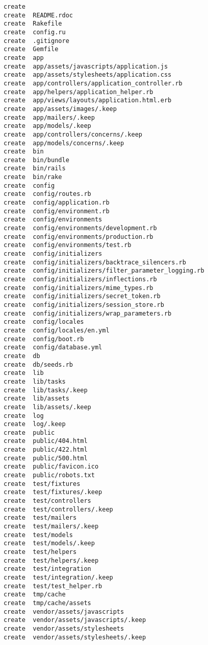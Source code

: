 \documentclass[bidi]{tufte-handout}
\begin{document}
\begin{verbatim}
      create
      create  README.rdoc
      create  Rakefile
      create  config.ru
      create  .gitignore
      create  Gemfile
      create  app
      create  app/assets/javascripts/application.js
      create  app/assets/stylesheets/application.css
      create  app/controllers/application_controller.rb
      create  app/helpers/application_helper.rb
      create  app/views/layouts/application.html.erb
      create  app/assets/images/.keep
      create  app/mailers/.keep
      create  app/models/.keep
      create  app/controllers/concerns/.keep
      create  app/models/concerns/.keep
      create  bin
      create  bin/bundle
      create  bin/rails
      create  bin/rake
      create  config
      create  config/routes.rb
      create  config/application.rb
      create  config/environment.rb
      create  config/environments
      create  config/environments/development.rb
      create  config/environments/production.rb
      create  config/environments/test.rb
      create  config/initializers
      create  config/initializers/backtrace_silencers.rb
      create  config/initializers/filter_parameter_logging.rb
      create  config/initializers/inflections.rb
      create  config/initializers/mime_types.rb
      create  config/initializers/secret_token.rb
      create  config/initializers/session_store.rb
      create  config/initializers/wrap_parameters.rb
      create  config/locales
      create  config/locales/en.yml
      create  config/boot.rb
      create  config/database.yml
      create  db
      create  db/seeds.rb
      create  lib
      create  lib/tasks
      create  lib/tasks/.keep
      create  lib/assets
      create  lib/assets/.keep
      create  log
      create  log/.keep
      create  public
      create  public/404.html
      create  public/422.html
      create  public/500.html
      create  public/favicon.ico
      create  public/robots.txt
      create  test/fixtures
      create  test/fixtures/.keep
      create  test/controllers
      create  test/controllers/.keep
      create  test/mailers
      create  test/mailers/.keep
      create  test/models
      create  test/models/.keep
      create  test/helpers
      create  test/helpers/.keep
      create  test/integration
      create  test/integration/.keep
      create  test/test_helper.rb
      create  tmp/cache
      create  tmp/cache/assets
      create  vendor/assets/javascripts
      create  vendor/assets/javascripts/.keep
      create  vendor/assets/stylesheets
      create  vendor/assets/stylesheets/.keep

\end{verbatim}
\end{document}
